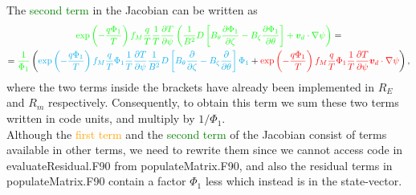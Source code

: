 \documentclass[12pt]{article}
\newcommand{\p}{\partial}
\newcommand{\na}{\nabla}
\begin{document}
\noindent The \textcolor{green}{second term} in the Jacobian can be written as 
\begin{multline}
  \label{eq:JacobianSecondTerm1}
  \textcolor{green}{
 \exp \left(- \frac{q \Phi_1}{T}  \right) f_{M} \frac{q}{T} \frac{1}{T} \frac{\p T}{\p \psi} \left(\frac{1}{B^2} D \left[B_\theta \frac{\p \Phi_1}{\p \zeta} - B_\zeta \frac{\p \Phi_1}{\p \theta}\right] + \bm{v}_d \cdot \na \psi\right)} = \\ = \textcolor{green}{
\frac{1}{\Phi_1}} \left(
\textcolor{cyan}{
 \exp \left(- \frac{q \Phi_1}{T}  \right) f_{M} \frac{q}{T} \Phi_1 \frac{1}{T} \frac{\p T}{\p \psi} \frac{1}{B^2} D \left[B_\theta \frac{\p }{\p \zeta} - B_\zeta \frac{\p }{\p \theta}\right] \Phi_1}
+
\textcolor{red}{
  \exp \left(- \frac{q \Phi_1}{T}  \right) f_{M} \frac{q}{T} \Phi_1 \frac{1}{T} \frac{\p T}{\p \psi} \bm{v}_d \cdot \na \psi }
\right),
\end{multline}
where the two terms inside the brackets have already been implemented in $R_E$ and $R_m$ respectively. Consequently, to obtain this term we sum these two terms written in code units, and multiply by $1 / \hat{\Phi}_1$.\\
Although the \textcolor{orange}{first term} and the \textcolor{green}{second term} of the Jacobian consist of terms available in other terms, we need to rewrite them since we cannot access code in evaluateResidual.F90 from populateMatrix.F90, and also the residual terms in populateMatrix.F90 contain a factor $\Phi_1$ less which instead is in the state-vector.
\end{document}
